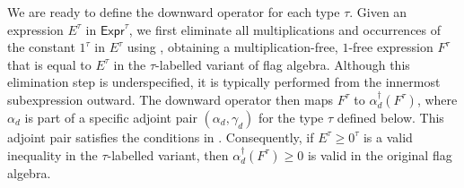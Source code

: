 \documentclass{article}
\newcommand*{\Expr}{\mathsf{Expr}}
\begin{document}
We are ready to define the downward operator for each type $\tau$. Given an expression $E^\tau$ in $\Expr^\tau$, we first eliminate all multiplications and occurrences of the constant $1^\tau$ in $E^\tau$ using , obtaining a multiplication-free, $1$-free expression $F^\tau$ that is equal to $E^\tau$ in the $\tau$-labelled variant of flag algebra. Although this elimination step is underspecified, it is typically performed from the innermost subexpression outward. The downward operator then maps $F^\tau$ to $\alpha_d^\dagger(F^\tau)$, where $\alpha_d$ is part of a specific adjoint pair $(\alpha_d,\gamma_d)$ for the type $\tau$ defined below. This adjoint pair satisfies the conditions in . Consequently, if $E^\tau \geq 0^\tau$ is a valid inequality in the $\tau$-labelled variant, then $\alpha_d^\dagger(F^\tau) \geq 0$ is valid in the original flag algebra.
\end{document}
